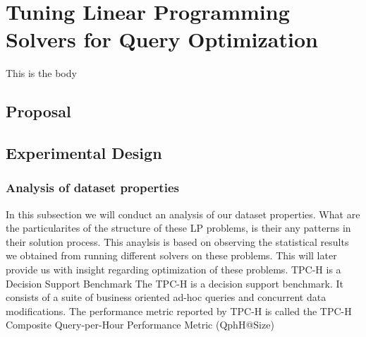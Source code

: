 
\chapter{Tuning Linear Programming Solvers for Query Optimization}\label{chapter:linearprogramming}
This is the body
\section{Proposal}

\section{Experimental Design}
\subsection{Analysis of dataset properties}
In  this subsection we will conduct an analysis of our dataset properties. What are the
particularites of the structure of these LP problems, is their any patterns in their solution
process. This anaylsis is based on observing the statistical results we obtained from
running different solvers on these problems. This will later provide us with insight
regarding optimization of these problems.
TPC-H is a Decision Support Benchmark
The TPC-H is a decision support benchmark. It consists
of a suite of business oriented ad-hoc queries and concurrent data modifications.
The performance metric reported by TPC-H is called the TPC-H Composite
Query-per-Hour Performance Metric (QphH@Size)

